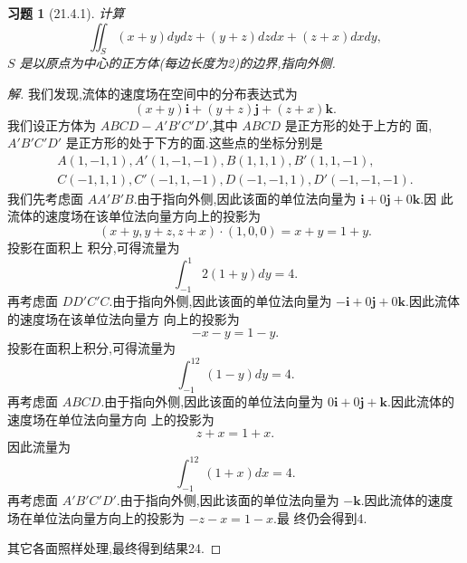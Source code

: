 \documentclass[a4paper, 12pt]{article} %
\newtheorem*{cdtheorem}{习题}
\newenvironment{exercise}
{\bigskip\begin{mdframed}[backgroundcolor=gray!40,rightline=false,leftline=false,topline=false,bottomline=false]\begin{cdtheorem}}
    {\end{cdtheorem}\end{mdframed}\bigskip}
\begin{document}
\begin{CJK}{UTF8}{gkai}
  \begin{exercise}[21.4.1]
计算
$$
\iint_S(x+y)dydz+(y+z)dzdx+(z+x)dxdy,
$$
$S$ 是以原点为中心的正方体(每边长度为2)的边界,指向外侧.
\end{exercise}
\begin{proof}[解]
我们发现,流体的速度场在空间中的分布表达式为
$$
(x+y)\mathbf{i}+(y+z)\mathbf{j}+(z+x)\mathbf{k}.
$$
我们设正方体为 $ABCD-A'B'C'D'$,其中 $ABCD$ 是正方形的处于上方的
面,$A'B'C'D'$ 是正方形的处于下方的面.这些点的坐标分别是
\begin{align*}
A(1,-1,1),A'(1,-1,-1),B(1,1,1),B'(1,1,-1),\\C(-1,1,1),C'(-1,1,-1),D(-1,-1,1),D'(-1,-1,-1).
\end{align*}
我们先考虑面 $AA'B'B$.由于指向外侧,因此该面的单位法向量为 $\mathbf{i}+0\mathbf{j}+0\mathbf{k}$.因
此流体的速度场在该单位法向量方向上的投影为
$$
(x+y,y+z,z+x)\cdot (1,0,0)=x+y=1+y.
$$
投影在面积上 积分,可得流量为
$$
\int_{-1}^{1}2(1+y)dy=4.
$$
再考虑面 $DD'C'C$.由于指向外侧,因此该面的单位法向量为
$\mathbf{-i}+0\mathbf{j}+0\mathbf{k}$.因此流体的速度场在该单位法向量方
向上的投影为
$$
-x-y=1-y.
$$
投影在面积上积分,可得流量为
$$
\int_{-1}^12(1-y)dy=4.
$$
再考虑面 $ABCD$.由于指向外侧,因此该面的单位法向量为
$0\mathbf{i}+0\mathbf{j}+\mathbf{k}$.因此流体的速度场在单位法向量方向
上的投影为
$$
z+x=1+x.
$$
因此流量为
$$
\int_{-1}^12(1+x)dx=4.
$$
再考虑面 $A'B'C'D'$.由于指向外侧,因此该面的单位法向量为
$-\mathbf{k}$.因此流体的速度场在单位法向量方向上的投影为 $-z-x=1-x$.最
终仍会得到4.

其它各面照样处理,最终得到结果24.
\end{proof}
  

  

  
\end{CJK}
\end{document}
